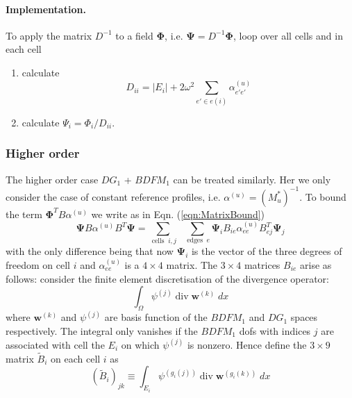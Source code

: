 \documentclass[12pt]{article}
\renewcommand{\vec}[1]{\boldsymbol{#1}}
\begin{document}
\paragraph{Implementation.}
To apply the matrix $D^{-1}$ to a field $\vec{\Phi}$, i.e. $\vec{\Psi}=D^{-1}\vec{\Phi}$, loop over all cells and in each cell
\begin{enumerate}
  \item calculate
\begin{equation}
  D_{ii} = |E_i| + 2\omega^2 \sum_{e'\in e(i)} \alpha^{(u)}_{e'e'}
\end{equation}
  \item calculate $\Psi_i = \Phi_i/D_{ii}$.
\end{enumerate}
\subsubsection{Higher order}
The higher order case $DG_1$ + $BDFM_1$ can be treated similarly. Her we only consider the case of constant reference profiles, i.e. $\alpha^{(u)}=\left(M_u^*\right)^{-1}$.
To bound the term $\vec{\Phi}^T B\alpha^{(u)}$ we write as in Eqn. (\ref{eqn:MatrixBound})
\begin{equation}
  \vec{\Psi} B \alpha^{(u)} B^T \vec{\Psi} = \sum_{\operatorname{cells}\;i,j}\;\;\sum_{\operatorname{edges}\;e} \vec{\Psi}_i B_{ie} \alpha^{(u)}_{ee} B^T_{ej} \vec{\Psi}_j 
\label{eqn:MatrixBoundBDFM1}
\end{equation}
with the only difference being that now $\vec{\Psi}_i$ is the vector of the three degrees of freedom on cell $i$ and $\alpha^{(u)}_{ee}$ is a $4\times 4$ matrix. The $3\times 4$ matrices $B_{ie}$ arise as follows: consider the finite element discretisation of the divergence operator:
\begin{equation}
  \int_{\Omega} \psi^{(j)}\operatorname{div}\vec{w}^{(k)}\; dx
\end{equation}
where $\vec{w}^{(k)}$ and $\psi^{(j)}$ are basis function of the $BDFM_1$ and $DG_1$ spaces respectively. The integral only vanishes if the $BDFM_1$ dofs with indices $j$ are associated with cell the $E_i$ on which $\psi^{(j)}$ is nonzero. Hence define the $3\times 9$ matrix $\tilde{B}_i$ on each cell $i$ as
\begin{equation}
  \left(\tilde{B}_i\right)_{jk} \equiv \int_{E_i} \psi^{(g_i(j))}\operatorname{div}\vec{w}^{(g_i(k))}\; dx
\end{equation}
\end{document}
